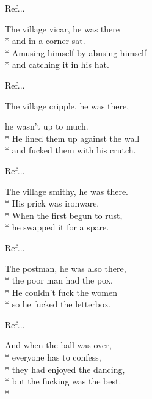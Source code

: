 \begin{SongText}
\begin{SongVerse}
    \end{SongVerse}
    \begin{SongVerse}
        Ref...
    \end{SongVerse}
    \begin{SongVerse}
        The village vicar, he was there\\*%
        and in a corner sat.\\*%
        Amusing himself by abusing himself\\*%
        and catching it in his hat.
    \end{SongVerse}
    \begin{SongVerse}
        Ref...
    \end{SongVerse}
    \begin{SongVerse}
        The village cripple, he was there,
    \end{SongVerse}
    \begin{SongVerse}
        he wasn't up to much.\\*%
        He lined them up against the wall\\*%
        and fucked them with his crutch.
    \end{SongVerse}
    \begin{SongVerse}
        Ref...
    \end{SongVerse}
    \begin{SongVerse}
        The village smithy, he was there.\\*%
        His prick was ironware.\\*%
        When the first begun to rust,\\*%
        he swapped it for a spare.
    \end{SongVerse}
    \begin{SongVerse}
        Ref...
    \end{SongVerse}
    \begin{SongVerse}
        The postman, he was also there,\\*%
        the poor man had the pox.\\*%
        He couldn't fuck the women\\*%
        so he fucked the letterbox.
    \end{SongVerse}
    \begin{SongVerse}
        Ref...
    \end{SongVerse}
    \begin{SongVerse}
        And when the ball was over,\\*%
        everyone has to confess,\\*%
        they had enjoyed the dancing,\\*%
        but the fucking was the best. \\*%
    \end{SongVerse}
\end{SongText}